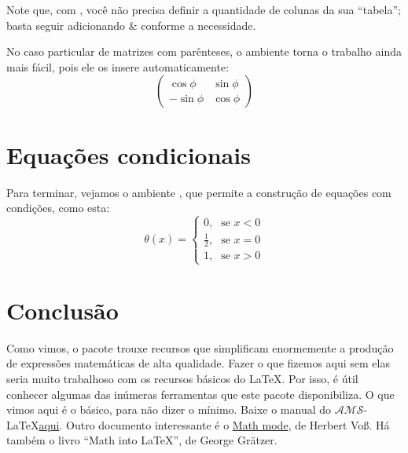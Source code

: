 \documentclass[a4paper,12pt]{amsart}
\newcommand{\amslatex}{$\mathcal {AMS}$-\LaTeX\xspace}
\begin{document}
	\medskip
	
	Note que, com , você não precisa definir a quantidade de colunas da sua ``tabela''; basta seguir adicionando \& conforme a necessidade.
	
	No caso particular de matrizes com parênteses, o ambiente  torna o trabalho ainda mais fácil, pois ele os insere automaticamente:
	\begin{equation*}
		\begin{pmatrix}
			 \cos\phi & \sin\phi \\
			-\sin\phi & \cos\phi
		\end{pmatrix}
	\end{equation*}
	
	\section{Equações condicionais}
	
	Para terminar, vejamos o ambiente , que permite a construção de equações com condições, como esta:
	\begin{equation*}
		\theta(x) =
		\begin{cases}
			0\text{,}           & \text{se $x < 0$} \\
			\frac{1}{2}\text{,} & \text{se $x = 0$} \\
			1\text{,}           & \text{se $x > 0$}
		\end{cases}
	\end{equation*}
	
	\section*{Conclusão}
	
	Como vimos, o pacote  trouxe recursos que simplificam enormemente a produção de expressões matemáticas de alta qualidade. Fazer o que fizemos aqui sem elas seria muito trabalhoso com os recursos básicos do \LaTeX. Por isso, é útil conhecer algumas das inúmeras ferramentas que este pacote disponibiliza. O que vimos aqui é o básico, para não dizer o mínimo. Baixe o manual do \amslatex \href{http://www.ams.org/tex/amslatex.html}{aqui}. Outro documento interessante é o \href{http://www.perce.de/LaTeX/}{Math mode}, de Herbert Vo\ss. Há também o livro ``Math into \LaTeX'', de George Grätzer.
	
\end{document}
